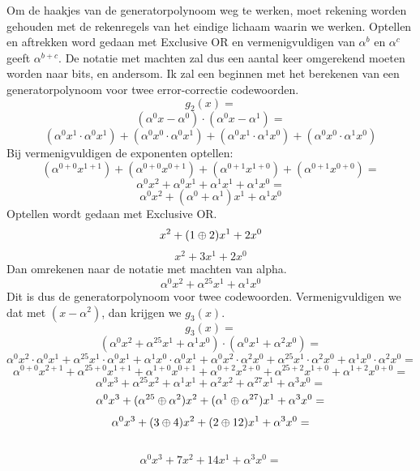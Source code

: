 \documentclass{article}
\begin{document}
Om de haakjes van de generatorpolynoom weg te werken, moet rekening worden gehouden met de rekenregels van het eindige lichaam waarin we werken. Optellen en aftrekken word gedaan met Exclusive OR en vermenigvuldigen van $\alpha^b$ en $\alpha^c$ geeft $\alpha^{b+c}$. De notatie met machten zal dus een aantal keer omgerekend moeten worden naar bits, en andersom. Ik zal een beginnen met het berekenen van een generatorpolynoom voor twee error-correctie codewoorden.
$$g_2(x)=$$
$$(\alpha^0x - \alpha^0) \cdot (\alpha^0x - \alpha^1)=$$
$$(\alpha^0x^1 \cdot \alpha^0x^1) + (\alpha^0x^0 \cdot \alpha^0x^1) + (\alpha^0x^1 \cdot \alpha^1x^0) + (\alpha^0x^0 \cdot \alpha^1x^0)$$
Bij vermenigvuldigen de exponenten optellen:
$$(\alpha^{0+0}x^{1+1}) + (\alpha^{0+0}x^{0+1}) + (\alpha^{0+1}x^{1+0}) + (\alpha^{0+1}x^{0+0})=$$
$$\alpha^0x^2 + \alpha^0x^1 + \alpha^1x^1 + \alpha^1x^0=$$
$$\alpha^0x^2 + (\alpha^0+\alpha^1)x^1 + \alpha^1x^0$$
Optellen wordt gedaan met Exclusive OR.
$$x^2 + (1\mathbin{\oplus}2)x^1 + 2x^0$$
$$x^2 + 3x^1 + 2x^0$$
Dan omrekenen naar de notatie met machten van alpha.
$$\alpha^0x^2 + \alpha^{25}x^1 + \alpha^1x^0$$
Dit is dus de generatorpolynoom voor twee codewoorden. Vermenigvuldigen we dat met $(x-\alpha^2)$, dan krijgen we $g_3(x)$.
$$g_3(x)=$$
$$(\alpha^0x^2 + \alpha^{25}x^1 + \alpha^1x^0) \cdot (\alpha^0x^1 + \alpha^2x^0)=$$
$$\alpha^0x^2 \cdot \alpha^0x^1 + \alpha^{25}x^1 \cdot \alpha^0x^1 + \alpha^1x^0 \cdot \alpha^0x^1 + \alpha^0x^2 \cdot \alpha^2x^0 + \alpha^25x^1 \cdot \alpha^2x^0 + \alpha^1x^0 \cdot \alpha^2x^0=$$
$$\alpha^{0+0}x^{2+1} + \alpha^{25+0}x^{1+1} + \alpha^{1+0}x^{0+1} + \alpha^{0+2}x^{2+0} + \alpha^{25+2}x^{1+0} + \alpha^{1+2}x^{0+0}=$$
$$\alpha^0x^3 + \alpha^{25}x^2 + \alpha^1x^1 + \alpha^2x^2 + \alpha^{27}x^1 + \alpha^3x^0=$$
$$\alpha^0x^3 + (\alpha^{25} \mathbin{\oplus} \alpha^2)x^2 + (\alpha^1 \mathbin{\oplus} \alpha^{27})x^1 + \alpha^3x^0=$$
$$\alpha^0x^3 + (3 \mathbin{\oplus} 4)x^2 + (2 \mathbin{\oplus} 12)x^1 + \alpha^3x^0=$$
\\
$$\alpha^0x^3 + 7x^2 + 14x^1 + \alpha^3x^0=$$
\end{document}
